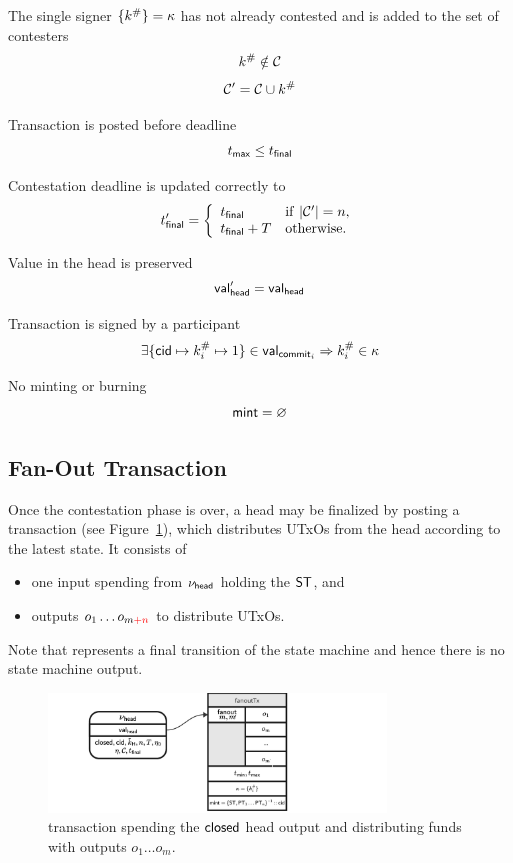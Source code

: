 \begin{menumerate}
	\item The single signer $\{k^{\#}\} = \kappa$ has not already contested and is added to the set of contesters
	\[
		k^{\#} \notin \mathcal{C}
	\]
	\[
		\mathcal{C}' = \mathcal{C} \cup k^{\#}
	\]
	\item Transaction is posted before deadline
	\[
		t_{\mathsf{max}} \leq t_{\mathsf{final}}
	\]
	\item Contestation deadline is updated correctly to
	\[
		t_{\mathsf{final}}' = \left\{\begin{array}{ll}
			t_{\mathsf{final}}     & \mathrm{if} ~ |\mathcal{C}'| = n, \\
			t_{\mathsf{final}} + T & \mathrm{otherwise.}
		\end{array}\right.
	\]
	\item Value in the head is preserved
	\[
		\mathsf{val}_{\mathsf{head}}' = \mathsf{val}_{\mathsf{head}}
	\]
	\item Transaction is signed by a participant
	\[
		\exists \{\mathsf{cid} \mapsto k^{\#}_{i} \mapsto 1\} \in \mathsf{val}_{\mathsf{commit}_{i}} \Rightarrow k^{\#}_{i} \in \kappa
	\]
	\item No minting or burning
	\[
		\mathsf{mint} = \varnothing
	\]
\end{menumerate}

\subsection{Fan-Out Transaction}

Once the contestation phase is over, a head may be finalized by posting a
\mtxFanout{} transaction (see Figure~\ref{fig:fanoutTx}), which
distributes UTxOs from the head according to the latest state. It consists of
\begin{itemize}
	\item one input spending from $\nu_\mathsf{head}$ holding the $\mathsf{ST}$, and
	\item outputs $o_{1} \dots o_{m\textcolor{red}{+n}}$ to distribute UTxOs.
\end{itemize}

Note that \mtxFanout{} represents a final transition of the state machine and
hence there is no state machine output.

\begin{figure}
	\centering
	\includegraphics[width=0.8\textwidth]{figures/fanoutTx.pdf}
	\caption{\mtxFanout{} transaction spending the $\mathsf{closed}$ head output and
		distributing funds with outputs $o_{1} \dots o_{m}$.}\label{fig:fanoutTx}
\end{figure}

